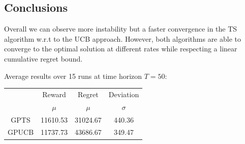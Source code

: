 \subsection{Conclusions}

Overall we can observe more instability but a faster convergence in the TS algorithm w.r.t to the UCB approach.
However, both algorithms are able to converge to the optimal solution at different rates while respecting a linear cumulative regret bound.

Average results over 15 runs at time horizon $T = 50$:

\begin{table}[h]
	\center
	\begin{tabular}{|c|cc|c|}
	\hline \hline
		\cellcolor{blue!25} & Reward 	& Regret	& Deviation \\
	\cline{2-4}
		\cellcolor{blue!25} & $\mu$		& $\mu$		& $\sigma$	\\
	\hline \hline
		GPTS 				& 11610.53 	& 31024.67	& 440.36 	\\
	\hline
		GPUCB				& 11737.73	& 43686.67	& 349.47	\\
	\hline \hline
	\end{tabular}
\end{table}
